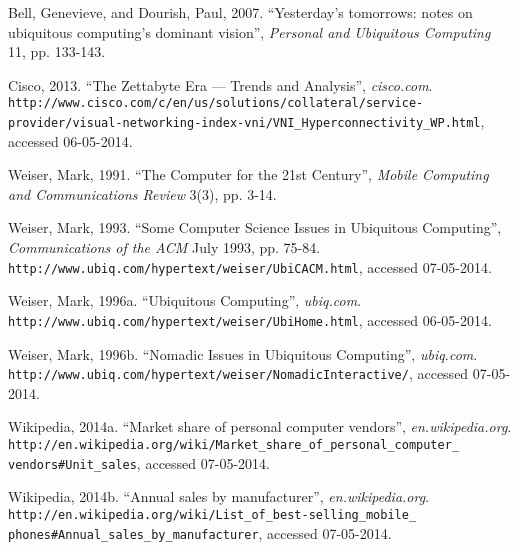 \begin{thebibliography}{9}

        Bell, Genevieve, and Dourish, Paul,
		2007.
        ``Yesterday's tomorrows: notes on ubiquitous computing's dominant vision'',
        \emph{Personal and Ubiquitous Computing} 11, pp. 133-143.
        
		Cisco,
		2013.
		``The Zettabyte Era --- Trends and Analysis'',
		\emph{cisco.com}.\\
        \verb+http://www.cisco.com/c/en/us/solutions/collateral/service-+
		\verb+provider/visual-networking-index-vni/VNI_Hyperconnectivity_WP.html+,
		accessed 06-05-2014.
	
        Weiser, Mark,
		1991.
        ``The Computer for the 21st Century'',
        \emph{Mobile Computing and Communications Review} 3(3), pp. 3-14.
		
		Weiser, Mark,
		1993.
		``Some Computer Science Issues in Ubiquitous Computing'',
		\emph{Communications of the ACM} July 1993, pp. 75-84.\\
		\verb+http://www.ubiq.com/hypertext/weiser/UbiCACM.html+,
		accessed 07-05-2014.
        
        Weiser, Mark,
		1996a.
        ``Ubiquitous Computing'',
		\emph{ubiq.com}.\\
        \verb+http://www.ubiq.com/hypertext/weiser/UbiHome.html+,
		accessed 06-05-2014.
        
		Weiser, Mark,
		1996b.
		``Nomadic Issues in Ubiquitous Computing'',
		\emph{ubiq.com}.\\
		\verb+http://www.ubiq.com/hypertext/weiser/NomadicInteractive/+,
		accessed 07-05-2014.
        
		Wikipedia,
		2014a.
		``Market share of personal computer vendors'',
		\emph{en.wikipedia.org}.\\
		\verb+http://en.wikipedia.org/wiki/Market_share_of_personal_computer_+
		\verb+vendors#Unit_sales+,
		accessed 07-05-2014.

		Wikipedia,
		2014b.
		``Annual sales by manufacturer'',
		\emph{en.wikipedia.org}.\\
		\verb+http://en.wikipedia.org/wiki/List_of_best-selling_mobile_+
		\verb+phones#Annual_sales_by_manufacturer+,
		accessed 07-05-2014.
 
\end{thebibliography}